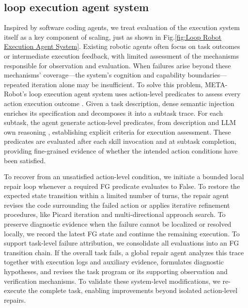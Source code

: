 \documentclass{article} %
\begin{document}
\subsection{loop execution agent system}
Inspired by software coding agents, we treat evaluation of the execution system itself as a key component of scaling, just as shown in Fig.\ref{fig:Loop Robot Execution Agent System}. Existing robotic agents often focus on task outcomes or intermediate execution feedback, with limited assessment of the mechanisms responsible for observation and evaluation. When failures arise beyond these mechanisms’ coverage—the system’s cognition and capability boundaries—repeated iteration alone may be insufficient.  To solve this problem, META-Robot’s loop execution agent system uses action-level predicates to assess every action execution outcome . Given a task description, dense semantic injection enriches its specification and decomposes it into a subtask trace. For each subtask, the agent generate action-level predicates, from description and LLM own reasoning , establishing explicit criteria for execution assessment. These predicates are evaluated after each skill invocation and at subtask completion, providing fine-grained evidence of whether the intended action conditions have been satisfied.

To recover from an unsatisfied action-level condition, we initiate a bounded local repair loop whenever a required FG predicate evaluates to False. To restore the expected state transition within a limited number of turns, the repair agent revises the code surrounding the failed action or applies iterative refinement procedures, like Picard iteration and multi-directional approach search. To preserve diagnostic evidence when the failure cannot be localized or resolved locally, we record the latest FG state and continue the remaining execution. To support task-level failure attribution, we consolidate all evaluations into an FG transition chain. If the overall task fails, a global repair agent analyzes this trace together with execution logs and auxiliary evidence, formulates diagnostic hypotheses, and revises the task program or its supporting observation and verification mechanisms. To validate these system-level modifications, we re-execute the complete task, enabling improvements beyond isolated action-level repairs.
\end{document}

